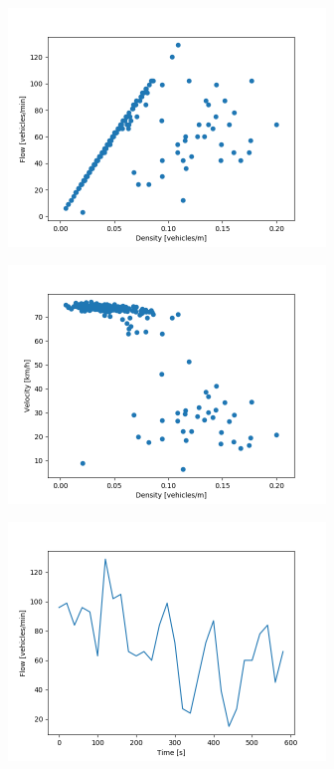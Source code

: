 \documentclass[english, 12pt, a4paper, elec, utf8, pdfa, online]{aaltothesis}
\begin{document}
\begin{figure}[h]
    \centering
    \includegraphics[width=0.75\textwidth]{graphs/Länsiväylä_2_flw_dns.png}
\end{figure}

\begin{figure}[h]
    \centering
    \includegraphics[width=0.75\textwidth]{graphs/Länsiväylä_2_spd_dns.png}
\end{figure}
\begin{figure}[h]
    \centering
    \includegraphics[width=0.75\textwidth]{graphs/Länsiväylä_2_flw_time_8.png}
\end{figure}
\end{document}
